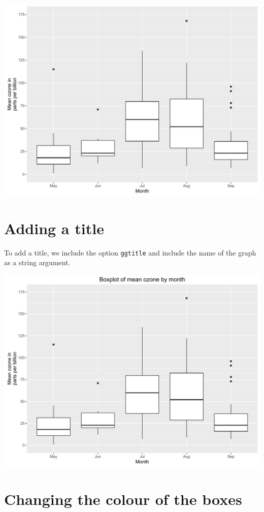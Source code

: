 \begin{center}\includegraphics[width=0.55\linewidth]{figures/box_4-1} \end{center}

\section{Adding a title}\label{adding-a-title-3}

To add a title, we include the option \texttt{ggtitle} and include the
name of the graph as a string argument.

\begin{Shaded}
\begin{Highlighting}[]
\StringTok{ }\StringTok{ }\NormalTok{(}\NormalTok{)}
\end{Highlighting}
\end{Shaded}

\begin{center}\includegraphics[width=0.55\linewidth]{figures/box_5-1} \end{center}

\section{Changing the colour of the
boxes}\label{changing-the-colour-of-the-boxes}

